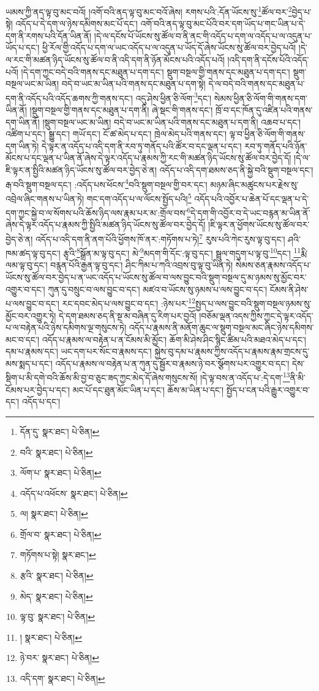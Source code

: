 ཡམས་ཀྱི་ནད་ལྟ་བུ་མང་བའོ། །འགོ་བའི་ནད་ལྟ་བུ་མང་བའོ་ཞེས། རགས་པའི་:དོན་ཡོངས་སུ་\footnote{དོན་དུ་  སྣར་ཐང་།  པེ་ཅིན། }ཚོལ་བར་\footnote{བའི་  སྣར་ཐང་།  པེ་ཅིན། }བྱེད་པ་སྟེ། འདོད་པ་དེ་དག་ལ་ཉེས་དམིགས་མང་པོ་དང་། འགོ་བའི་ནད་ལྟ་བུ་མང་པོའི་བར་དག་ཡོད་པ་གང་ཡིན་པ་དེ་དག་ནི་རགས་པའི་དོན་ཡིན་ནོ། །དེ་ལ་དངོས་པོ་ཡོངས་སུ་ཚོལ་བ་ནི་ནང་གི་འདོད་པ་དག་ལ་འདོད་པ་ལ་འདུན་པ་ཡོད་པ་དང་། ཕྱི་རོལ་གྱི་འདོད་པ་དག་ལ་ཡང་འདོད་པ་ལ་འདུན་པ་ཡོད་དོ་ཞེས་ཡོངས་སུ་ཚོལ་བར་བྱེད་པའོ། །དེ་ལ་རང་གི་མཚན་ཉིད་ཡོངས་སུ་ཚོལ་བ་ནི་འདི་དག་ནི་ཉོན་མོངས་པའི་འདོད་པའོ། །འདི་དག་ནི་དངོས་པོའི་འདོད་པའོ། །དེ་དག་ཀྱང་བདེ་བའི་གནས་དང་མཐུན་པ་དག་དང་། སྡུག་བསྔལ་གྱི་གནས་དང་མཐུན་པ་དག་དང་། སྡུག་བསྔལ་ཡང་མ་ཡིན། བདེ་བ་ཡང་མ་ཡིན་པའི་གནས་དང་མཐུན་པ་དག་སྟེ། དེ་ལ་བདེ་བའི་གནས་དང་མཐུན་པ་དག་ནི་འདོད་པའི་འདོད་ཆགས་ཀྱི་གནས་དང་། འདུ་ཤེས་ཕྱིན་ཅི་ལོག་\footnote{ལོག་པ་  སྣར་ཐང་།  པེ་ཅིན། }དང་། སེམས་ཕྱིན་ཅི་ལོག་གི་གནས་དག་ཡིན་ནོ། །སྡུག་བསྔལ་གྱི་གནས་དང་མཐུན་པ་དག་ནི། ཞེ་སྡང་གི་གནས་དང་། ཁྲོ་བ་དང་ཁོན་དུ་འཛིན་པའི་གནས་དག་ཡིན་ནོ། །སྡུག་བསྔལ་ཡང་མ་ཡིན། བདེ་བ་ཡང་མ་ཡིན་པའི་གནས་དང་མཐུན་པ་དག་ནི། འཆབ་པ་དང་། འཚིག་པ་དང་། སྒྱུ་དང་། གཡོ་དང་། ངོ་ཚ་མེད་པ་དང་། ཁྲེལ་མེད་པའི་གནས་དང་། ལྟ་བ་ཕྱིན་ཅི་ལོག་གི་གནས་དག་ཡིན་ཏེ། དེ་ལྟར་ན་འདོད་པ་འདི་དག་ནི་རབ་ཏུ་གནོད་པའི་ཚོར་བ་དང་ལྡན་པ་དང་། རབ་ཏུ་གནོད་པའི་ཉོན་མོངས་པ་དང་ལྡན་པ་ཡིན་ནོ་ཞེས་དེ་ལྟར་འདོད་པ་རྣམས་ཀྱི་རང་གི་མཚན་ཉིད་ཡོངས་སུ་ཚོལ་བར་བྱེད་དོ། །དེ་ལ་ཇི་ལྟར་ན་སྤྱིའི་མཚན་ཉིད་ཡོངས་སུ་ཚོལ་བར་བྱེད་ཅེ་ན། འདོད་པ་འདི་དག་ཐམས་ཅད་ནི་སྐྱེ་བའི་སྡུག་བསྔལ་དང་། རྒ་བའི་སྡུག་བསྔལ་དང་། :འདོད་པས་ཕོངས་\footnote{འདོད་པ་འཕོངས་  སྣར་ཐང་།  པེ་ཅིན། }བའི་སྡུག་བསྔལ་གྱི་བར་དང་། མཉམ་ཞིང་མཚུངས་པར་རྗེས་སུ་འབྲེལ་ཞིང་གནས་པ་ཡིན་ཏེ། གང་དག་འདོད་པ་ལ་ལོངས་སྤྱོད་པའི།\footnote{ལ།  སྣར་ཐང་།  པེ་ཅིན། } འདོད་པའི་འབྱོར་པ་ཆེན་པོ་དང་ལྡན་པ་དེ་དག་ཀྱང་སྐྱེ་བ་ལ་སོགས་པའི་ཆོས་ཉིད་ལས་རྣམ་པར་མ་:གྲོལ་བས་\footnote{གྲོལ་བ་  སྣར་ཐང་།  པེ་ཅིན། }དེ་དག་གི་འབྱོར་བ་དེ་ཡང་བརྙན་མ་ཡིན་ནོ་ཞེས་དེ་ལྟར་འདོད་པ་རྣམས་ཀྱི་སྤྱིའི་མཚན་ཉིད་ཡོངས་སུ་ཚོལ་བར་བྱེད་དོ། །ཇི་ལྟར་ན་ཕྱོགས་ཡོངས་སུ་ཚོལ་བར་བྱེད་ཅེ་ན། འདོད་པ་འདི་དག་ནི་ནག་པོའི་ཕྱོགས་ཁོ་ནར་:གཏོགས་པ་ཏེ།\footnote{གཏོགས་པ་སྟེ།  སྣར་ཐང་། } རུས་པའི་ཀེང་རུས་ལྟ་བུ་དང་། ཤའི་ཁམ་ཚད་ལྟ་བུ་དང་། རྩྭའི་\footnote{རྩའི་  སྣར་ཐང་།  པེ་ཅིན། }སྒྲོན་མ་ལྟ་བུ་དང་། མེ་\footnote{མེད་  སྣར་ཐང་།  པེ་ཅིན། }མདག་གི་དོང་:ལྟ་བུ་དང་། སྦྲུལ་གདུག་པ་ལྟ་བུ་\footnote{ལྟ་བུ་  སྣར་ཐང་།  པེ་ཅིན། }དང་། \footnote{།    སྣར་ཐང་།  པེ་ཅིན། }རྨི་ལམ་ལྟ་བུ་དང་། བརྙན་པོའི་རྒྱན་ལྟ་བུ་དང་། ཤིང་ཀིམ་པ་ཀའི་འབྲས་བུ་ལྟ་བུ་ཡིན་ཏེ། སེམས་ཅན་རྣམས་འདོད་པ་ཡོངས་སུ་ཚོལ་བར་བྱེད་པ་ན་ཡང་འདོད་པ་ཡོངས་སུ་ཚོལ་བ་ལས་བྱུང་བའི་སྡུག་བསྔལ་དུ་མ་ཉམས་སུ་མྱོང་བར་འགྱུར་བ་དང་། ཀུན་དུ་བསྲུང་བ་ལས་བྱུང་བ་དང་། མཛའ་བ་ཡོངས་སུ་ཉམས་པ་ལས་བྱུང་བ་དང་། ངོམས་ནི་ཤེས་པ་ལས་བྱུང་བ་དང་། རང་དབང་མེད་པ་ལས་བྱུང་བ་དང་། :ཉེས་པར་\footnote{ཉེ་བར་  སྣར་ཐང་།  པེ་ཅིན། }སྤྱད་པ་ལས་བྱུང་བའི་སྡུག་བསྔལ་ཉམས་སུ་མྱོང་བར་འགྱུར་ཏེ། དེ་དག་ཐམས་ཅད་ནི་སྔ་མ་བཞིན་དུ་རིག་པར་བྱའོ། །བཅོམ་ལྡན་འདས་ཀྱིས་ཀྱང་དེ་ལྟར་འདོད་པ་ལ་བརྟེན་པའི་ཉེས་དམིགས་ལྔ་གསུངས་ཏེ། འདོད་པ་རྣམས་ནི་མནོག་ཆུང་ལ་སྡུག་བསྔལ་མང་ཞིང་ཉེས་དམིགས་མང་བ་དང་། འདོད་པ་རྣམས་ལ་བརྟེན་པ་ན་ངོམས་མི་མྱོང་། ཆོག་མི་ཤེས་ཤིང་སྙིང་ཚིམ་པའི་མཐའ་མེད་པ་དང་། དམ་པ་རྣམས་དང་། ཡང་དག་པར་སོང་བ་རྣམས་དང་། སྐྱེས་བུ་དམ་པ་རྣམས་ཀྱིས་འདོད་པ་རྣམས་རྣམ་གྲངས་དུ་མས་སྨད་པ་དང་། འདོད་པ་རྣམས་ལ་བརྟེན་པ་ན་ཀུན་དུ་སྦྱོར་བ་རྣམས་ཉེ་བར་སྩོགས་པར་འགྱུར་བ་དང་། དེས་སྡིག་པ་མི་དགེ་བའི་ཆོས་མི་བྱ་བ་ཅུང་ཟད་ཀྱང་མེད་དོ་ཞེས་གསུངས་སོ། །དེ་ལྟ་བས་ན་འདོད་པ་:དེ་དག་\footnote{འདི་དག་  སྣར་ཐང་།  པེ་ཅིན། }ནི་མི་ངོམས་པར་བྱེད་པ་དང་། མང་པོ་དང་ཐུན་མོང་ཡིན་པ་དང་། ཆོས་མ་ཡིན་པ་དང་། སྤྱོད་པ་ངན་པའི་རྒྱུར་འགྱུར་བ་དང་། འདོད་པ་དང་། 